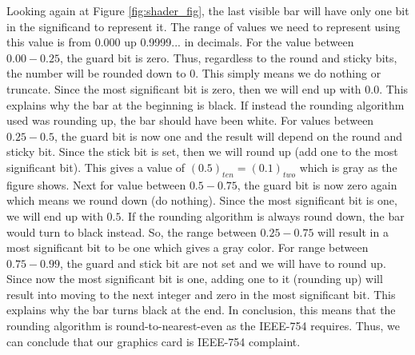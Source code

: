 Looking again at Figure \ref{fig:shader_fig}, the last visible bar will have only one bit in the significand to represent it. The range of values we need to represent using this value is from 0.000 up 0.9999... in decimals. For the value between $0.00-0.25$, the guard bit is zero. Thus, regardless to the round and sticky bits, the number will be rounded down to 0. This simply means we do nothing or truncate. Since the most significant bit is zero, then we will end up with $0.0$. This explains why the bar at the beginning is black. If instead the rounding algorithm used was rounding up, the bar should have been white. For values between $0.25-0.5$, the guard bit is now one and the result will depend on the round and sticky bit. Since the stick bit is set, then we will round up (add one to the most significant bit). This gives a value of $(0.5)_{ten}=(0.1)_{two}$ which is gray as the figure shows. Next for value between $0.5-0.75$, the guard bit is now zero again which means we round down (do nothing). Since the most significant bit is one, we will end up with $0.5$. If the rounding algorithm is always round down, the bar would turn to black instead. So, the range between $0.25-0.75$ will result in a most significant bit to be one which gives a gray color. For range between $0.75-0.99$, the guard and stick bit are not set and we will have to round up. Since now the most significant bit is one, adding one to it (rounding up) will result into moving to the next integer and zero in the most significant bit. This explains why the bar turns black at the end. In conclusion, this means that the rounding algorithm is round-to-nearest-even as the IEEE-754 requires. Thus, we can conclude that our graphics card is IEEE-754 complaint. 

 





